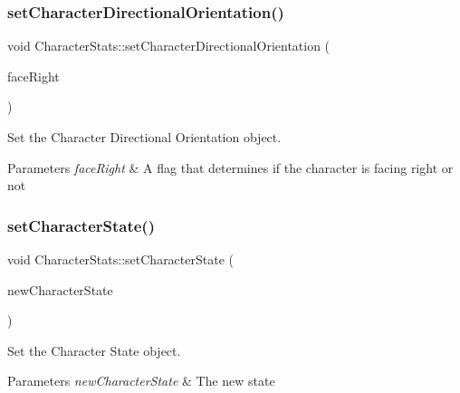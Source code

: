 \subsubsection{\texorpdfstring{setCharacterDirectionalOrientation()}{setCharacterDirectionalOrientation()}}
{\footnotesize\ttfamily void Character\+Stats\+::set\+Character\+Directional\+Orientation (\begin{DoxyParamCaption}\item[{bool}]{face\+Right }\end{DoxyParamCaption})\hspace{0.3cm}{\ttfamily [inline]}}



Set the Character Directional Orientation object. 


\begin{DoxyParams}{Parameters}
{\em face\+Right} & A flag that determines if the character is facing right or not \\
\hline
\end{DoxyParams}
\mbox{\label{classCharacterStats_ae6624dc6f06e58e635296ad5336cdd70}} 
\subsubsection{\texorpdfstring{setCharacterState()}{setCharacterState()}}
{\footnotesize\ttfamily void Character\+Stats\+::set\+Character\+State (\begin{DoxyParamCaption}\item[{State\+Of\+Character}]{new\+Character\+State }\end{DoxyParamCaption})\hspace{0.3cm}{\ttfamily [inline]}}



Set the Character State object. 


\begin{DoxyParams}{Parameters}
{\em new\+Character\+State} & The new state \\
\hline
\end{DoxyParams}
\mbox{\label{classCharacterStats_a7359c58479aebab283da03a0503cedf0}} 
